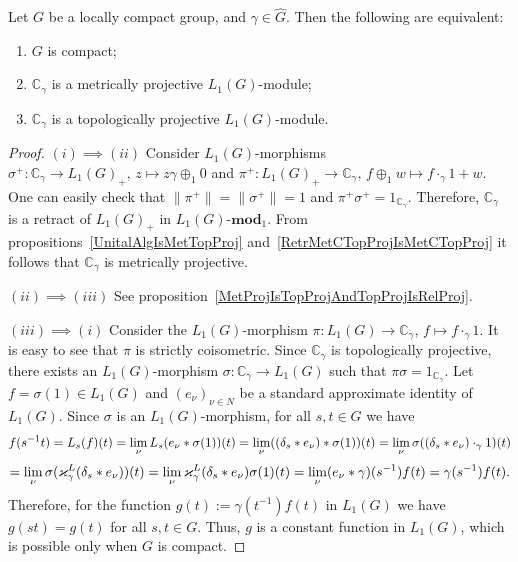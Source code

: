 \begin{proposition}\label{OneDimL1ModMetTopProjCharac} Let $G$ be a locally 
compact group, and $\gamma\in\widehat{G}$. Then the following are equivalent:

\begin{enumerate}[label = (\roman*)]
    \item $G$ is compact;

    \item $\mathbb{C}_\gamma$ is a metrically projective $L_1(G)$-module;

    \item $\mathbb{C}_\gamma$ is a topologically projective $L_1(G)$-module.
\end{enumerate}
\end{proposition}
\begin{proof} $(i)\implies (ii)$ Consider $L_1(G)$-morphisms 
$\sigma^+:\mathbb{C}_\gamma\to {L_1(G)}_+,\, z\mapsto z\gamma \oplus_1 0$ 
and $\pi^+:{L_1(G)}_+\to\mathbb{C}_\gamma,\, f\oplus_1 w\mapsto f\cdot_{\gamma}1+w$. 
One can easily check 
that $\lVert\pi^+\rVert=\lVert\sigma^+\rVert=1$ 
and $\pi^+\sigma^+=1_{\mathbb{C}_\gamma}$. Therefore, $\mathbb{C}_\gamma$ is a 
retract of ${L_1(G)}_+$ in $L_1(G)\text{-}\mathbf{mod}_1$. From 
propositions~\ref{UnitalAlgIsMetTopProj} 
and~\ref{RetrMetCTopProjIsMetCTopProj} it follows 
that $\mathbb{C}_\gamma$ is metrically projective.

$(ii)\implies (iii)$ See
proposition~\ref{MetProjIsTopProjAndTopProjIsRelProj}.

$(iii)\implies (i)$ Consider the $L_1(G)$-morphism
$\pi:L_1(G)\to\mathbb{C}_\gamma,\, f\mapsto f\cdot_{\gamma} 1$. It is easy to see
that $\pi$ is strictly coisometric. Since $\mathbb{C}_\gamma$ is topologically
projective, there exists an $L_1(G)$-morphism $\sigma:\mathbb{C}_\gamma\to
L_1(G)$ such that $\pi\sigma=1_{\mathbb{C}_\gamma}$. Let $f=\sigma(1)\in L_1(G)$
and ${(e_\nu)}_{\nu\in N}$ be a standard approximate identity of $L_1(G)$. Since
$\sigma$ is an $L_1(G)$-morphism, for all $s,t\in G$ we have 
\[
f(s^{-1}t)
=L_s(f)(t)
=\lim_\nu L_s(e_\nu\ast \sigma(1))(t)
=\lim_\nu((\delta_s\ast e_\nu)\ast \sigma(1))(t)
=\lim_\nu\sigma((\delta_s\ast e_\nu)\cdot_{\gamma} 1)(t)
\]
\[
=\lim_\nu\sigma(\varkappa_\gamma^L(\delta_s\ast e_\nu))(t)
=\lim_\nu\varkappa_\gamma^L(\delta_s\ast e_\nu)\sigma(1)(t)
=\lim_\nu(e_\nu\ast\gamma)(s^{-1})f(t)
=\gamma(s^{-1})f(t).
\]
Therefore, for the function $g(t):=\gamma(t^{-1})f(t)$ in $L_1(G)$ we have
$g(st)=g(t)$ for all $s,t\in G$. Thus, $g$ is a constant function in $L_1(G)$,
which is possible only when $G$ is compact.
\end{proof}

